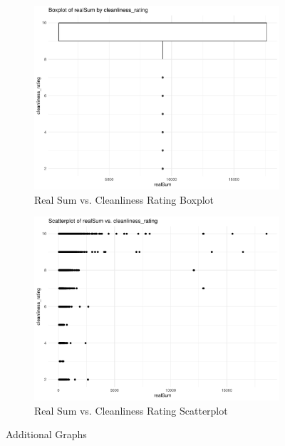 \documentclass[12pt, letterpaper]{article}
\begin{document}
\begin{figure}[H]
  \vspace{0.05\textwidth}

  \begin{subfigure}{0.45\textwidth}
    \includegraphics[width=\linewidth]{realSum_cleanliness_rating__boxplot.pdf}
    \caption{Real Sum vs. Cleanliness Rating Boxplot}
    \label{fig:realSum_cleanliness_rating__boxplot}
  \end{subfigure}
  \hspace{0.05\textwidth}
  \begin{subfigure}{0.45\textwidth}
    \includegraphics[width=\linewidth]{realSum_cleanliness_rating__scatterplot.pdf}
    \caption{Real Sum vs. Cleanliness Rating Scatterplot}
    \label{fig:realSum_cleanliness_rating__scatterplot}
  \end{subfigure}

  \caption{Additional Graphs}
  \label{fig:additional_graphs_4}
\end{figure}
\end{document}
